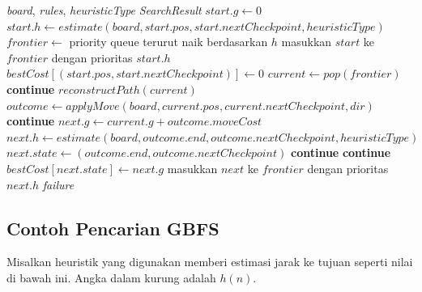 \begin{algorithm}[H]
    \caption{Greedy Best-First Search (GBFS) pada Solver}
    \begin{algorithmic}[1]
        \Require \textit{board}, \textit{rules}, \textit{heuristicType}
        \Ensure \textit{SearchResult}
        \State $start.g \gets 0$
        \State $start.h \gets estimate(board, start.pos, start.nextCheckpoint, heuristicType)$
        \State $frontier \gets$ priority queue terurut naik berdasarkan $h$
        \State masukkan $start$ ke $frontier$ dengan prioritas $start.h$
        \State $bestCost[(start.pos, start.nextCheckpoint)] \gets 0$
        \State $current \gets pop(frontier)$
        \State \textbf{continue}
        \EndIf
        \State \Return $reconstructPath(current)$
        \EndIf
        \State $outcome \gets applyMove(board, current.pos, current.nextCheckpoint, dir)$
        \State \textbf{continue}
        \EndIf
        \State $next.g \gets current.g + outcome.moveCost$
        \State $next.h \gets estimate(board, outcome.end, outcome.nextCheckpoint, heuristicType)$
        \State $next.state \gets (outcome.end, outcome.nextCheckpoint)$
        \State \textbf{continue}
        \EndIf
        \State \textbf{continue}
        \EndIf
        \State $bestCost[next.state] \gets next.g$
        \State masukkan $next$ ke $frontier$ dengan prioritas $next.h$
        \EndFor
        \EndWhile
        \State \Return \textit{failure}
    \end{algorithmic}
\end{algorithm}

\subsection{Contoh Pencarian GBFS}
Misalkan heuristik yang digunakan memberi estimasi jarak ke tujuan seperti nilai di bawah ini. Angka dalam kurung adalah $h(n)$.

